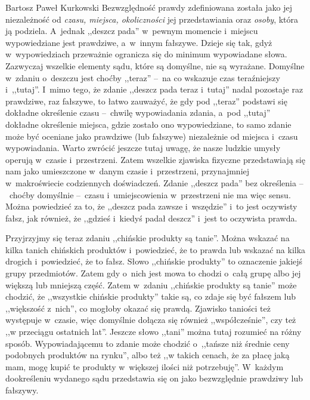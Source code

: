 \begin{artplenv}{Bartosz Paweł Kurkowski}
Bezwzględność prawdy zdefiniowana została jako jej niezależność od \textit{czasu, miejsca, okoliczności} jej
przedstawiania oraz \textit{osoby}, która ją podziela. A~jednak ,,deszcz pada'' w~pewnym momencie i~miejscu wypowiedziane
jest prawdziwe, a~w~innym fałszywe. Dzieje się tak, gdyż w~wypowiedziach przeważnie ogranicza się do minimum
wypowiadane słowa. Zazwyczaj wszelkie elementy sądu, które są domyślne, nie są wyrażane. Domyślne w~zdaniu o~deszczu
jest choćby ,,teraz'' --~na co wskazuje czas teraźniejszy i~,,tutaj''. I~mimo tego, że zdanie ,,deszcz pada teraz i~tutaj''
nadal pozostaje raz prawdziwe, raz fałszywe, to łatwo zauważyć, że gdy pod ,,teraz'' podstawi się dokładne określenie
czasu --~chwilę wypowiadania zdania, a~pod ,,tutaj'' dokładne określenie miejsca, gdzie zostało ono wypowiedziane, to samo
zdanie może być oceniane jako prawdziwe (lub fałszywe) niezależnie od miejsca i~czasu wypowiadania. Warto zwrócić
jeszcze tutaj uwagę, że nasze ludzkie umysły operują w~czasie i~przestrzeni. Zatem wszelkie zjawiska fizyczne
przedstawiają się nam jako umieszczone w~danym czasie i~przestrzeni, przynajmniej w~makroświecie codziennych
doświadczeń. Zdanie ,,deszcz pada'' bez określenia --~choćby domyślnie --~czasu i~umiejscowienia w~przestrzeni nie ma więc
sensu. Można powiedzieć za to, że ,,deszcz pada zawsze i~wszędzie'' i~to jest oczywisty fałsz, jak również, że ,,gdzieś
i~kiedyś padał deszcz'' i~jest to oczywista prawda.


Przyjrzyjmy się teraz zdaniu ,,chińskie produkty są tanie''. Można wskazać na kilka tanich chińskich
produktów i~powiedzieć, że to prawda lub wskazać na kilka drogich i~powiedzieć, że to fałsz. Słowo ,,chińskie produkty'' to
oznaczenie jakiejś grupy przedmiotów. Zatem gdy o~nich jest mowa to chodzi o~całą grupę albo jej większą lub mniejszą
część. Zatem w~zdaniu ,,chińskie produkty są tanie'' może chodzić, że ,,wszystkie chińskie produkty'' takie są, co zdaje
się być fałszem lub ,,większość z~nich'', co mogłoby okazać się prawdą. Zjawisko taniości też występuje w~czasie, więc
domyślnie dołącza się również ,,współcześnie'', czy też ,,w przeciągu ostatnich lat''. Jeszcze słowo ,,tani'' można tutaj
rozumieć na różny sposób. Wypowiadającemu to zdanie może chodzić o~,,tańsze niż średnie ceny podobnych produktów na
rynku'', albo też ,,w takich cenach, że za płacę jaką mam, mogę kupić te produkty w~większej ilości niż potrzebuję''.
W~każdym dookreśleniu wydanego sądu przedstawia się on jako bezwzględnie prawdziwy lub fałszywy.



\end{artplenv}
